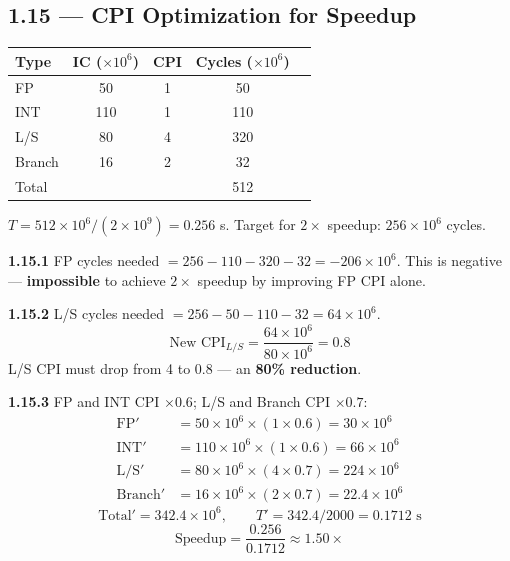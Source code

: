 \subsection*{1.15 --- CPI Optimization for Speedup}
\hypertarget{sol-1.15}{}

\begin{center}
\begin{tabular}{lcccc}
\toprule
Type & IC ($\times 10^6$) & CPI & Cycles ($\times 10^6$) \\
\midrule
FP     & 50  & 1 & 50  \\
INT    & 110 & 1 & 110 \\
L/S    & 80  & 4 & 320 \\
Branch & 16  & 2 & 32  \\
\midrule
Total  &     &   & 512 \\
\bottomrule
\end{tabular}
\end{center}

$T = 512 \times 10^6 / (2 \times 10^9) = 0.256$ s.  Target for $2\times$
speedup: $256 \times 10^6$ cycles.

\medskip\noindent\textbf{1.15.1}
FP cycles needed $= 256 - 110 - 320 - 32 = -206 \times 10^6$.
This is negative --- \textbf{impossible} to achieve $2\times$ speedup by
improving FP CPI alone.

\medskip\noindent\textbf{1.15.2}
L/S cycles needed $= 256 - 50 - 110 - 32 = 64 \times 10^6$.
\[
  \text{New CPI}_{L/S} = \frac{64 \times 10^6}{80 \times 10^6} = 0.8
\]
L/S CPI must drop from 4 to 0.8 --- an \textbf{80\% reduction}.

\medskip\noindent\textbf{1.15.3}
FP and INT CPI $\times 0.6$; L/S and Branch CPI $\times 0.7$:
\begin{align*}
  \text{FP}' &= 50 \times 10^6 \times (1 \times 0.6) = 30 \times 10^6 \\
  \text{INT}' &= 110 \times 10^6 \times (1 \times 0.6) = 66 \times 10^6 \\
  \text{L/S}' &= 80 \times 10^6 \times (4 \times 0.7) = 224 \times 10^6 \\
  \text{Branch}' &= 16 \times 10^6 \times (2 \times 0.7) = 22.4 \times 10^6
\end{align*}
\[
  \text{Total}' = 342.4 \times 10^6, \qquad
  T' = 342.4 / 2000 = 0.1712\text{ s}
\]
\[
  \text{Speedup} = \frac{0.256}{0.1712} \approx 1.50\times
\]

